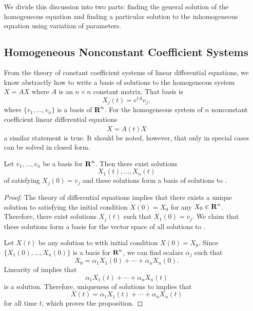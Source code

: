 \documentclass{ximera}
\begin{document}
We divide this discussion into two parts: finding the 
general solution 
of the homogeneous equation and finding 
a particular 
solution to the 
inhomogeneous equation using variation of parameters.

\subsection*{Homogeneous Nonconstant Coefficient Systems}

From the theory of constant coefficient systems of linear differential 
equations, we know abstractly how to write  a  basis of solutions to
the homogeneous system  $\dot{X}=AX$ where $A$ is an $n\times n$
constant matrix.  That basis is 
\[
X_j(t) = e^{tA}v_j,
\]
where $\{v_1,\ldots,v_n\}$ is a basis of $\mbox{$\bf{R}$}^n$.  For the 
homogeneous 
system of $n$ nonconstant coefficient linear differential equations
\begin{equation}  \label{E:NCCH}
\dot{X} = A(t) X
\end{equation}
a similar statement is true.   It should be noted, however, that only in 
special cases can  be solved in closed form.

\begin{prop}  \label{P:NCCH}
Let $v_1,\ldots,v_n$ be a basis 
for $\mbox{$\bf{R}$}^n$.  Then there exist solutions 
\[
X_1(t),\ldots,X_n(t)
\]
of  satisfying $X_j(0)=v_j$ and these
solutions form a basis of solutions 
to .
\end{prop}

\begin{proof} The theory of differential equations implies that there exists a 
unique solution to   satisfying the initial condition $X(0)=X_0$ 
for any $X_0\in\mbox{$\bf{R}$}^n$.   Therefore, there exist solutions $X_j(t)$ such that 
$X_1(0)=v_j$.  We claim that these solutions form a basis for the vector 
space of all solutions to .   

Let $X(t)$ be any solution to  with initial condition $X(0)=X_0$. 
Since $\{X_1(0),\ldots,X_n(0)\}$ is a basis for $\mbox{$\bf{R}$}^n$, we can find scalars 
$\alpha_j$ such that 
\[
X_0 = \alpha_1X_1(0) + \cdots + \alpha_nX_n(0).
\]
Linearity of  implies that 
\[
\alpha_1X_1(t) + \cdots + \alpha_nX_n(t)
\]
is a solution.  Therefore, uniqueness of solutions to  implies 
that 
\[
X(t) = \alpha_1X_1(t) + \cdots + \alpha_nX_n(t)
\]
for all time $t$, which proves the proposition. \end{proof}
\end{document}
